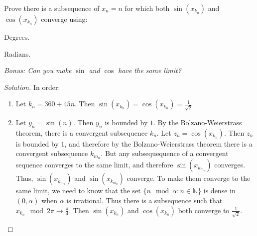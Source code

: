 \documentclass[crop=false,class=article,oneside]{standalone}
\begin{document}
        \begin{problem}
            Prove there is a subsequence of $x_{n}=n$ for which
            both $\sin(x_{k_{n}})$ and $\cos(x_{k_{n}})$
            converge using:
            \begin{enumerate}
                \begin{multicols}{2}
                    \item Degrees.
                    \item Radians.
                \end{multicols}
            \end{enumerate}
            \textit{%
                Bonus: Can you make $\sin$ and $\cos$
                have the same limit?
            }
        \end{problem}
        \begin{proof}[Solution]
            In order:
            \begin{enumerate}
                \item Let $k_{n}=360+45n$. Then
                      $\sin(x_{k_n})=\cos(x_{k_{n}})%
                       =\frac{1}{\sqrt{2}}$
                \item Let $y_{n}=\sin(n)$. Then $y_{n}$ is bounded
                      by $1$. By the Bolzano-Weierstrass theorem,
                      there is a convergent subsequence $k_{n}$.
                      Let $z_{n}=\cos(x_{k_{n}})$. Then $z_{n}$
                      is bounded by $1$, and therefore by the
                      Bolzano-Weierstrass theorem there is a
                      convergent subsequence $k_{m_{n}}$. But
                      any subsequequence of a convergent sequence
                      converges to the same limit, and therefore
                      $\sin(x_{k_{m_{n}}})$ converges. Thus,
                      $\sin(x_{k_{m_{n}}})$ and
                      $\sin(x_{k_{m_{n}}})$ converge. To make
                      them converge to the same limit, we need
                      to know that the set
                      $\{n\mod\alpha:n\in\mathbb{N}\}$ is dense
                      in $(0,\alpha)$ when $\alpha$ is
                      irrational. Thus there is a
                      subsequence such that
                      $x_{k_{n}}\mod{2\pi}%
                       \rightarrow{\frac{\pi}{4}}$. Then
                      $\sin(x_{k_{n}})$ and
                      $\cos(x_{k_{n}})$ both converge to
                      $\frac{1}{\sqrt{2}}$.
            \end{enumerate}
        \end{proof}
\end{document}
